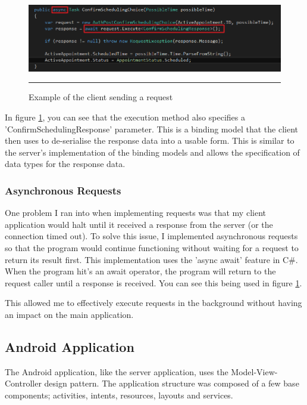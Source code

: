 \begin{figure}[htbp]
	\centering
		\includegraphics[width=\textwidth,height=\textheight,keepaspectratio]{Figures/ExampleResponse.png}
		\rule{35em}{0.5pt}
		\caption[Example of the client sending a request]{Example of the client sending a request}
	\label{fig:exampleresponse}
\end{figure}

In figure \ref{fig:exampleresponse}, you can see that the execution method also specifies a 'ConfirmSchedulingResponse' parameter. This is a binding model that the client then uses to de-serialise the response data into a usable form. This is similar to the server's implementation of the binding models and allows the specification of data types for the response data.

\subsubsection{Asynchronous Requests}

One problem I ran into when implementing requests was that my client application would halt until it received a response from the server (or the connection timed out). To solve this issue, I implemented asynchronous requests so that the program would continue functioning without waiting for a request to return its result first. This implementation uses the 'async await' feature in C\#. When the program hit's an await operator, the program will return to the request caller until a response is received. You can see this being used in figure \ref {fig:exampleresponse}.

This allowed me to effectively execute requests in the background without having an impact on the main application.

\subsection{Android Application}

The Android application, like the server application, uses the Model-View-Controller design pattern. The application structure was composed of a few base components; activities, intents, resources, layouts and services.

